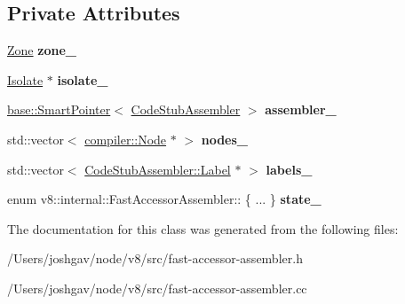 \subsection*{Private Attributes}
\begin{DoxyCompactItemize}
\item 
\hyperlink{classv8_1_1internal_1_1_zone}{Zone} {\bfseries zone\+\_\+}\hypertarget{classv8_1_1internal_1_1_fast_accessor_assembler_ac7c7bfdeb4e80f51f886254a8b8be404}{}\label{classv8_1_1internal_1_1_fast_accessor_assembler_ac7c7bfdeb4e80f51f886254a8b8be404}

\item 
\hyperlink{classv8_1_1internal_1_1_isolate}{Isolate} $\ast$ {\bfseries isolate\+\_\+}\hypertarget{classv8_1_1internal_1_1_fast_accessor_assembler_ae3a1256a74c0c2f342f77ee776cc6da3}{}\label{classv8_1_1internal_1_1_fast_accessor_assembler_ae3a1256a74c0c2f342f77ee776cc6da3}

\item 
\hyperlink{classv8_1_1base_1_1_smart_pointer}{base\+::\+Smart\+Pointer}$<$ \hyperlink{classv8_1_1internal_1_1_code_stub_assembler}{Code\+Stub\+Assembler} $>$ {\bfseries assembler\+\_\+}\hypertarget{classv8_1_1internal_1_1_fast_accessor_assembler_a8640daba74068dd0d02bf3e487266ccd}{}\label{classv8_1_1internal_1_1_fast_accessor_assembler_a8640daba74068dd0d02bf3e487266ccd}

\item 
std\+::vector$<$ \hyperlink{classv8_1_1internal_1_1compiler_1_1_node}{compiler\+::\+Node} $\ast$ $>$ {\bfseries nodes\+\_\+}\hypertarget{classv8_1_1internal_1_1_fast_accessor_assembler_aa4ed36477a757338464ddddd7a211167}{}\label{classv8_1_1internal_1_1_fast_accessor_assembler_aa4ed36477a757338464ddddd7a211167}

\item 
std\+::vector$<$ \hyperlink{classv8_1_1internal_1_1compiler_1_1_code_assembler_1_1_label}{Code\+Stub\+Assembler\+::\+Label} $\ast$ $>$ {\bfseries labels\+\_\+}\hypertarget{classv8_1_1internal_1_1_fast_accessor_assembler_ac9f3a88f71f90fda7ac43a2011b2154b}{}\label{classv8_1_1internal_1_1_fast_accessor_assembler_ac9f3a88f71f90fda7ac43a2011b2154b}

\item 
enum v8\+::internal\+::\+Fast\+Accessor\+Assembler\+:: \{ ... \}  {\bfseries state\+\_\+}\hypertarget{classv8_1_1internal_1_1_fast_accessor_assembler_ae3b84f6bdcc5e777d1a124e0d1d7a4f7}{}\label{classv8_1_1internal_1_1_fast_accessor_assembler_ae3b84f6bdcc5e777d1a124e0d1d7a4f7}

\end{DoxyCompactItemize}


The documentation for this class was generated from the following files\+:\begin{DoxyCompactItemize}
\item 
/\+Users/joshgav/node/v8/src/fast-\/accessor-\/assembler.\+h\item 
/\+Users/joshgav/node/v8/src/fast-\/accessor-\/assembler.\+cc\end{DoxyCompactItemize}
